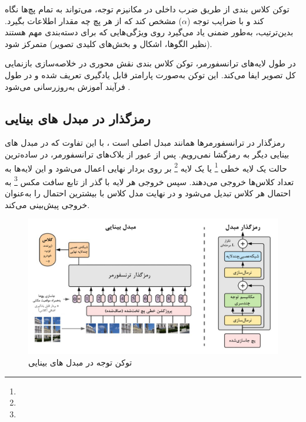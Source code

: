 توکن کلاس بندی از طریق ضرب داخلی در مکانیزم توجه، می‌تواند به تمام پچ‌ها نگاه کند و با ضرایب توجه (\(\alpha\)) مشخص کند که از هر پچ چه مقدار اطلاعات بگیرد. بدین‌ترتیب، به‌طور ضمنی یاد می‌گیرد روی ویژگی‌هایی که برای دسته‌بندی مهم هستند (نظیر الگوها، اشکال و بخش‌های کلیدی تصویر) متمرکز شود.

در طول لایه‌های ترانسفورمر، توکن کلاس بندی نقش محوری در خلاصه‌سازی بازنمایی کل تصویر ایفا می‌کند. این توکن به‌صورت پارامتر قابل یادگیری تعریف شده و در طول فرآیند آموزش به‌روزرسانی می‌شود \cite{devlin2018bert,dosovitskiy2020image}.

\subsection{رمزگذار در مبدل های بینایی}

رمزگذار در ترانسفورمرها همانند مبدل اصلی است \cite{vaswani2017attention}، با این تفاوت که در مبدل های بینایی \cite{dosovitskiy2020image} دیگر به رمزگشا نمی‌رویم. پس از عبور از بلاک‌های ترانسفورمر، در ساده‌ترین حالت یک لایه خطی \footnote{} یا یک لایه  \footnote{} بر روی بردار نهایی اعمال می‌شود و این لایه‌ها به تعداد کلاس‌ها خروجی می‌دهند.  
سپس خروجی هر لایه با گذر از تابع سافت مکس \footnote{} به احتمال هر کلاس تبدیل می‌شود و در نهایت مدل کلاس با بیشترین احتمال را به‌عنوان خروجی پیش‌بینی می‌کند.

\begin{figure}[h]
	\centering
	\begin{minipage}[b]{0.9\textwidth}
		\centering
		\includegraphics[width=\textwidth]{transformer_images/persian images/persian_images/b08.png}
		\caption{توکن توجه در مبدل های بینایی}
		\label{fig:Cls Token In Vision Transformer}
	\end{minipage}
	\hfill
\end{figure}

